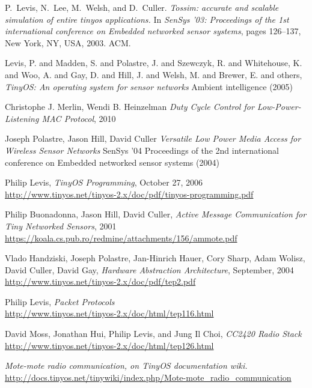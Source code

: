 \begin{thebibliography}{99}
  P.~Levis, N.~Lee, M.~Welsh, and D.~Culler.
  \textit{Tossim: accurate and scalable
  simulation of entire tinyos applications.}
  \newblock In {\em SenSys '03: Proceedings of the
  1st international conference on Embedded
  networked sensor systems}, pages 126--137, New
  York, NY, USA, 2003. ACM.

  Levis, P. and Madden, S. and Polastre, J. and Szewczyk, R. and Whitehouse, K. and Woo, A. and Gay, D. and Hill, J. and Welsh, M. and Brewer, E. and others,
  \textit{TinyOS: An operating system for sensor networks}
  Ambient intelligence (2005)

  Christophe J. Merlin, Wendi B. Heinzelman
  \textit{Duty Cycle Control for Low-Power-Listening MAC Protocol}, 2010 

  Joseph Polastre, Jason Hill, David Culler
  \textit{Versatile Low Power Media Access for Wireless Sensor Networks}
  SenSys '04 Proceedings of the 2nd international conference on Embedded networked sensor systems (2004)


  Philip Levis, \textit{TinyOS Programming}, October 27, 2006 \\
  \url{http://www.tinyos.net/tinyos-2.x/doc/pdf/tinyos-programming.pdf}

  Philip Buonadonna, Jason Hill, David Culler,
  \textit{Active Message Communication for Tiny Networked Sensors}, 2001 \\
  \url{https://koala.cs.pub.ro/redmine/attachments/156/ammote.pdf}

  Vlado Handziski, Joseph Polastre, Jan-Hinrich Hauer, Cory Sharp,
  Adam Wolisz, David Culler, David Gay, \textit{Hardware Abstraction Architecture}, September,  2004 \\
  \url{http://www.tinyos.net/tinyos-2.x/doc/pdf/tep2.pdf}

  Philip Levis, \textit{Packet Protocols} \\
  \url{http://www.tinyos.net/tinyos-2.x/doc/html/tep116.html}

  David Moss, Jonathan Hui, Philip Levis, and Jung Il Choi,
  \textit{CC2420 Radio Stack} \\
  \url{http://www.tinyos.net/tinyos-2.x/doc/html/tep126.html}

  \textit{Mote-mote radio communication, on TinyOS documentation wiki.} \\
  \url{http://docs.tinyos.net/tinywiki/index.php/Mote-mote_radio_communication}


\end{thebibliography}
